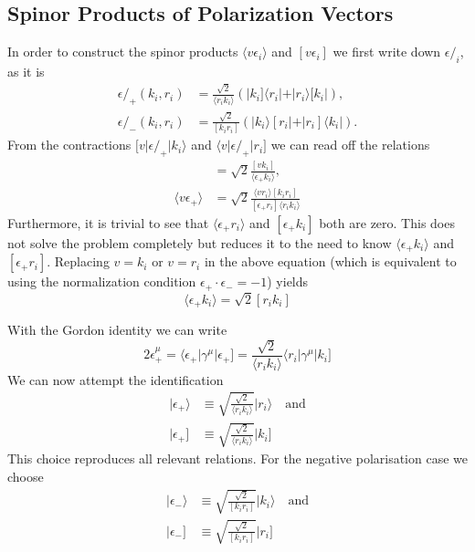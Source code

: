 \documentclass[11pt,a4paper]{refrep}
\newcommand{\fmslash}[1]{{#1}\!\!\!/}
\begin{document}
\subsection{Spinor Products of Polarization Vectors}
In order to construct the spinor products $\langle v\epsilon_i\rangle$
and $[v\epsilon_i]$ we first write down $\fmslash{\epsilon}_i$, as it is
\begin{align}
\fmslash{\epsilon}_+(k_i, r_i) &=\frac{\sqrt{2}}{\langle r_ik_i\rangle}
\left(\vert k_i]\langle r_i\vert + \vert r_i\rangle[k_i\vert\right),\\
\fmslash{\epsilon}_-(k_i, r_i) &=\frac{\sqrt{2}}{[k_ir_i]}
\left(\vert k_i\rangle[r_i\vert + \vert r_i]\langle k_i\vert\right).
\end{align}
From the contractions $[v\vert\fmslash{\epsilon}_+\vert k_i\rangle$
and $\langle v\vert\fmslash{\epsilon}_+\vert r_i]$ we can read off
the relations
\begin{align}
[v\epsilon_+] &= \sqrt{2}\frac{[vk_i]}{\langle\epsilon_+k_i\rangle},\\
\langle v\epsilon_+\rangle &=\sqrt{2}\frac%
{\langle vr_i\rangle[k_ir_i]}{[\epsilon_+r_i]\langle r_ik_i\rangle}
\end{align}
Furthermore, it is trivial to see that $\langle\epsilon_+r_i\rangle$
and $[\epsilon_+k_i]$ both are zero.
This does not solve the problem completely but reduces it to the need to know
$\langle\epsilon_+k_i\rangle$ and $[\epsilon_+r_i]$. Replacing
$v=k_i$ or $v=r_i$ in the above equation (which is equivalent to
using the normalization condition $\epsilon_+\cdot\epsilon_-=-1$)
yields
\begin{equation}
[r_i\epsilon_+]\langle\epsilon_+k_i\rangle = \sqrt{2}[r_ik_i]
\end{equation}

With the Gordon identity we can write
\begin{equation}
2\epsilon_+^\mu=\langle\epsilon_+\vert\gamma^\mu\vert\epsilon_+]
=\frac{\sqrt{2}}{\langle r_ik_i\rangle}\langle r_i\vert\gamma^\mu\vert k_i]
\end{equation}
We can now attempt the identification
\begin{align}
\vert\epsilon_+\rangle &\equiv\sqrt{\frac{\sqrt{2}}{\langle r_ik_i\rangle}}
   \vert r_i\rangle
\quad\text{and}\\
\vert\epsilon_+] &\equiv\sqrt{\frac{\sqrt{2}}{\langle r_ik_i\rangle}}
   \vert k_i]
\end{align}
This choice reproduces all relevant relations. For the negative polarisation
case we choose
\begin{align}
\vert\epsilon_-\rangle &\equiv\sqrt{\frac{\sqrt{2}}{[k_ir_i]}}
   \vert k_i\rangle
\quad\text{and}\\
\vert\epsilon_-] &\equiv\sqrt{\frac{\sqrt{2}}{[k_ir_i]}}
   \vert r_i]
\end{align}
\end{document}
